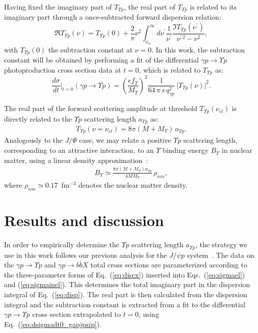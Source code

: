 \documentclass[10pt,prd,aps,nofootinbib,superscriptaddress]{revtex4}
\newcommand{\beq}{\begin{equation}}
\newcommand{\eeq}{\end{equation}}
\newcommand{\bea}{\begin{eqnarray}}
\newcommand{\eea}{\end{eqnarray}}
\begin{document}
Having fixed the imaginary part of $T_{\Upsilon p}$,  
the real part of $T_{\Upsilon p}$ is related to its imaginary part
through a once-subtracted forward dispersion relation:
\beq
\Re T_{\Upsilon p}(\nu) = T_{\Upsilon p}(0) + \frac{2}{\pi} \nu^2 \int_{\nu_{el}}^\infty d
\nu^\prime \frac{1}{\nu^\prime} \frac{\Im T_{\Upsilon p}(\nu^\prime)}{\nu^{\prime \, 2} - \nu^2},
\label{eq:disp}
\eeq
with $T_{\Upsilon p}(0) $ the subtraction constant at $\nu = 0$. In this work, the subtraction constant will be obtained by performing a fit of the 
differential $\gamma p \to \Upsilon p$  photoproduction cross section data at $t=0$, which is related to $T_{\Upsilon p}$ as:
\beq
\frac{d \sigma}{dt} \biggr|_{t = 0} (\gamma p \to \Upsilon p) 
= \left( \frac{e f_\Upsilon}{M_\Upsilon} \right)^2  \frac{1}{64 \, \pi \, s \, q_{\gamma p}^2} \, \big| T_{\Upsilon p}(\nu) \big|^2.
\label{eq:dsigmadt0_gapjpsip}
\eeq

The real part of the forward scattering amplitude at threshold $T_{\Upsilon p}(\nu_{el}) $ is directly related to the $\Upsilon p$ scattering length 
$a_{\Upsilon p}$ as:
\bea
T_{\Upsilon p}(\nu = \nu_{el}) = 8 \pi (M + M_\Upsilon) \, a_{\Upsilon p}. 
\eea
Analogously to the $J/\Psi$ case, 
we may relate a positive $\Upsilon p$ scattering length, corresponding to an attractive interaction, 
to an $\Upsilon$ binding energy $B_\Upsilon$ in nuclear matter, using a linear density approximation~\cite{Kaidalov:1992hd}:
\begin{eqnarray}
B_\Upsilon \simeq \frac{8 \pi (M + M_\Upsilon) a_{\Upsilon p}}{4 M M_\Upsilon} \, \rho_{nm},
\label{eq:nmbe}
\end{eqnarray}
where $\rho_{nm} \simeq 0.17$~fm$^{-3}$ denotes the nuclear matter density.



\section{Results and discussion}

In order to empirically determine the $\Upsilon p$ scattering length $a_{\Upsilon p}$, the strategy we use in this work follows our previous analysis for 
the $J/\psi p$ system~\cite{Gryniuk:2016mpk}. The data on the $\gamma p \to \Upsilon p$ and $\gamma p \to b \bar b X$ total cross sections 
are parameterized according to the three-parameter forms of Eq.~(\ref{eq:discx}) inserted into Eqs.~(\ref{eq:sigmael}) and (\ref{eq:sigmainel}).
This determines the total imaginary part in the dispersion integral of Eq.~(\ref{eq:disp}). The real part is then calculated from the dispersion integral  
and the subtraction constant is extracted from a fit to the differential $\gamma p \to \Upsilon p$ cross section extrapolated to $t = 0$, using Eq.~(\ref{eq:dsigmadt0_gapjpsip}).
 
\end{document}
